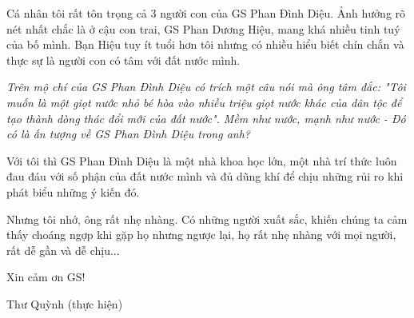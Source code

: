 Cá nhân tôi rất tôn trọng cả 3 người con của GS Phan Đình Diệu. Ảnh hưởng rõ nét nhất chắc là ở cậu con trai, GS Phan Dương Hiệu, mang khá nhiều tinh tuý của bố mình. Bạn Hiệu tuy ít tuổi hơn tôi nhưng có nhiều hiểu biết chín chắn và thực sự là người con có tâm với đất nước mình.

\emph{Trên mộ chí của GS Phan Đình Diệu có trích một câu nói mà ông tâm đắc: "Tôi muốn là một giọt nước nhỏ bé hòa vào nhiều triệu giọt nước khác của dân tộc để tạo thành dòng thác đổi mới của đất nước". Mềm như nước, mạnh như nước - Đó có là ấn tượng về GS Phan Đình Diệu trong anh? }

Với tôi thì GS Phan Đình Diệu là một nhà khoa học lớn, một nhà trí thức luôn đau đáu với số phận của đất nước mình và đủ dũng khí để chịu những rủi ro khi phát biểu những ý kiến đó.

Nhưng tôi nhớ, ông rất nhẹ nhàng.  Có những người xuất sắc, khiến chúng ta cảm thấy choáng ngợp khi gặp họ nhưng ngược lại, họ rất nhẹ nhàng với mọi người, rất dễ gần và dễ chịu...

Xin cảm ơn GS!

Thư Quỳnh (thực hiện)
